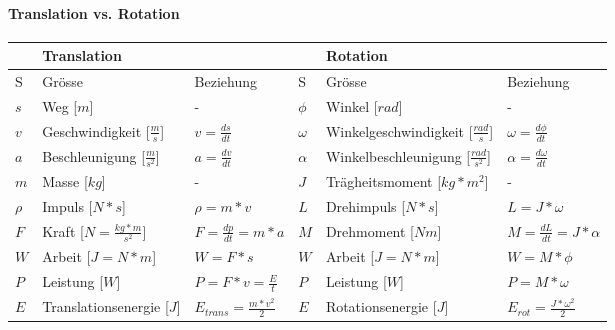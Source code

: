 \paragraph{Translation vs. Rotation}
\begin{tabbing}
	\begin{tabu} to \linewidth {l|l|l||l|l|l}
		\toprule
		& Translation & &  & Rotation &  \\ 
		\midrule
        S & Grösse & Beziehung & S & Grösse & Beziehung \\
        \midrule
        $s$ & Weg [$m$] & - & $\phi$ & Winkel [$rad$] & - \\ \hline
        $v$ & Geschwindigkeit [$\frac{m}{s}$] & $v=\frac{ds}{dt}$ & $\omega$ & Winkelgeschwindigkeit [$\frac{rad}{s}$] & $\omega = \frac{d\phi}{dt}$ \\ \hline
        $a$ & Beschleunigung [$\frac{m}{s^2}$] & $a=\frac{dv}{dt}$ & $\alpha$ & Winkelbeschleunigung [$\frac{rad}{s^2}$] & $\alpha = \frac{d\omega}{dt}$ \\ \hline
        $m$ & Masse [$kg$] & - & $J$ & Trägheitsmoment [$kg*m^2$] & - \\ \hline
        $\rho$ & Impuls [$N*s$] & $\rho = m * v$ & $L$ & Drehimpuls [$N * s$] & $L = J * \omega$ \\ \hline
        $F$ & Kraft [$N = \frac{kg*m}{s^2}$] & $F = \frac{dp}{dt}=m*a$ & $M$ & Drehmoment [$Nm$] & $M = \frac{dL}{dt} = J * \alpha$ \\ \hline
        $W$ & Arbeit [$J = N * m$] & $W = F * s$ & $W$ & Arbeit [$J = N * m$] & $W = M * \phi$ \\ \hline
        $P$ & Leistung [$W$] & $P = F*v = \frac{E}{t}$ & $P$ & Leistung [$W$] & $P = M * \omega$ \\ \hline
        $E$ & Translationsenergie [$J$] & $E_{trans} = \frac{m*v^2}{2}$ & $E$ & Rotationsenergie [$J$] & $E_{rot} = \frac{J*\omega^2}{2}$ \\ \hline
		\bottomrule
	 \end{tabu}
\end{tabbing}